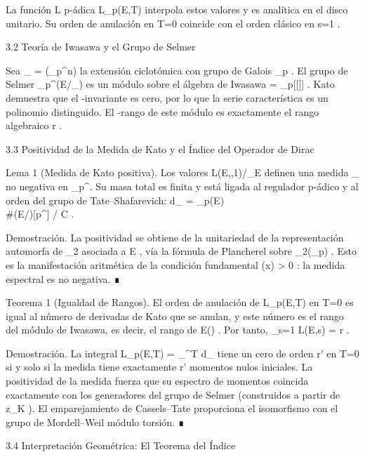 \documentclass[12pt,twoside]{book}
\begin{document}
La función L p‑ádica  L_p(E,T)  interpola estos valores y es analítica en el disco unitario. Su orden de anulación en  T=0  coincide con el orden clásico en  s=1 .

3.2 Teoría de Iwasawa y el Grupo de Selmer

Sea  _{\infty} = \bigcup {}(\mu_{p^n})  la extensión ciclotómica con grupo de Galois  \Gamma \cong {}_p . El grupo de Selmer  _{p^\infty}(E/_{\infty})  es un módulo sobre el álgebra de Iwasawa  \Lambda = _p[[\Gamma]] . Kato demuestra que el  \mu -invariante es cero, por lo que la serie característica es un polinomio distinguido. El  \Lambda -rango de este módulo es exactamente el rango algebraico  r .

3.3 Positividad de la Medida de Kato y el Índice del Operador de Dirac

Lema 1 (Medida de Kato positiva).
Los valores  L(E,\chi,1)/\Omega_E  definen una medida  \mu_{}  no negativa en  _p^\times . Su masa total es finita y está ligada al regulador p‑ádico y al orden del grupo de Tate–Shafarevich:  \int d\mu_{} = _p(E) \cdot \\#(E/)[p^\infty] / C .

Demostración. La positividad se obtiene de la unitariedad de la representación automorfa de  _2  asociada a  E , vía la fórmula de Plancherel sobre  _2(_p) . Esto es la manifestación aritmética de la condición fundamental  \rho(x) > 0 : la medida espectral es no negativa. ∎

Teorema 1 (Igualdad de Rangos).
El orden de anulación de  L_p(E,T)  en  T=0  es igual al número de derivadas de Kato que se anulan, y este número es el rango del módulo de Iwasawa, es decir, el rango de  E() . Por tanto,  _{s=1} L(E,s) = r .

Demostración. La integral  L_p(E,T) = \int \chi_{}^T d\mu_{}  tiene un cero de orden  r'  en  T=0  si y solo si la medida tiene exactamente  r'  momentos nulos iniciales. La positividad de la medida fuerza que su espectro de momentos coincida exactamente con los generadores del grupo de Selmer (construidos a partir de  z_K ). El emparejamiento de Cassels–Tate proporciona el isomorfismo con el grupo de Mordell–Weil módulo torsión. ∎

3.4 Interpretación Geométrica: El Teorema del Índice
\end{document}
